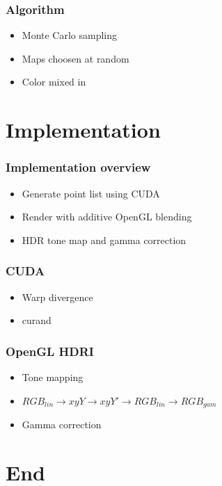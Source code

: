 \documentclass{beamer}
\begin{document}
\begin{frame}
  \frametitle{Algorithm}
  \begin{itemize}
    \item
      Monte Carlo sampling
    \item
      Maps choosen at random
    \item
      Color mixed in
  \end{itemize}
\end{frame}


\section{Implementation}

\begin{frame}
  \frametitle{Implementation overview}
  \begin{itemize}
    \item
      Generate point list using CUDA
    \item
      Render with additive OpenGL blending
    \item
      HDR tone map and gamma correction
  \end{itemize}
\end{frame}


\begin{frame}
  \frametitle{CUDA}
  \begin{itemize}
    \item
      Warp divergence
    \item
      curand
  \end{itemize}
\end{frame}


\begin{frame}
  \frametitle{OpenGL HDRI}
  \begin{itemize}
    \item
      Tone mapping
    \item
      $RGB_{lin}\to xyY \to xyY' \to RGB_{lin} \to RGB_{gam}$
    \item
      Gamma correction
  \end{itemize}
\end{frame}



\section*{End}
\end{document}
